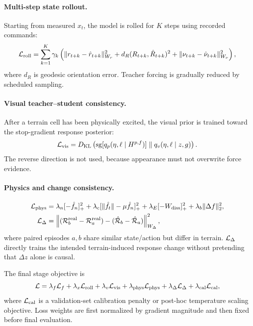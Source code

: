\paragraph{Multi-step state rollout.}
Starting from measured $x_t$, the model is rolled for $K$ steps using recorded commands:
\begin{equation}
\mathcal{L}_{\mathrm{roll}}=\sum_{k=1}^{K}\gamma_k
\left(\lVert r_{t+k}-\hat r_{t+k}\rVert_{W_r}^2+
d_R(R_{t+k},\hat R_{t+k})^2+
\lVert\nu_{t+k}-\hat\nu_{t+k}\rVert_{W_\nu}^2\right),
\label{eq:rollout_loss}
\end{equation}
where $d_R$ is geodesic orientation error. Teacher forcing is gradually reduced by scheduled sampling.

\paragraph{Visual teacher--student consistency.}
After a terrain cell has been physically excited, the visual prior is trained toward the stop-gradient response posterior:
\begin{equation}
\mathcal{L}_{\mathrm{vis}}=
D_{\mathrm{KL}}\left(\operatorname{sg}[q_p(\eta,\ell\mid H^{p,f})]\;\Vert\;q_v(\eta,\ell\mid z,g)\right).
\label{eq:vis_distill}
\end{equation}
The reverse direction is not used, because appearance must not overwrite force evidence.

\paragraph{Physics and change consistency.}
\begin{align}
\mathcal{L}_{\mathrm{phys}} &=
\lambda_n[-\hat f_n]_+^2+
\lambda_c[\lVert\hat f_t\rVert-\mu\hat f_n]_+^2+
\lambda_E[-W_{\mathrm{diss}}]_+^2+
\lambda_b\lVert\Delta f\rVert_2^2,\\
\mathcal{L}_\Delta &=
\left\lVert
(\mathcal R_b^{\mathrm{real}}-\mathcal R_a^{\mathrm{real}})
-(\hat{\mathcal R}_b-\hat{\mathcal R}_a)
\right\rVert_{W_\Delta}^2,
\label{eq:physics_change_loss}
\end{align}
where paired episodes $a,b$ share similar state/action but differ in terrain. $\mathcal{L}_\Delta$ directly trains the intended terrain-induced response change without pretending that $\Delta z$ alone is causal.

The final stage objective is
\begin{equation}
\mathcal{L}=\lambda_f\mathcal{L}_f+\lambda_x\mathcal{L}_{\mathrm{roll}}+\lambda_v\mathcal{L}_{\mathrm{vis}}
+\lambda_{\mathrm{phys}}\mathcal{L}_{\mathrm{phys}}+\lambda_\Delta\mathcal{L}_\Delta
+\lambda_{\mathrm{cal}}\mathcal{L}_{\mathrm{cal}},
\label{eq:total_loss}
\end{equation}
where $\mathcal{L}_{\mathrm{cal}}$ is a validation-set calibration penalty or post-hoc temperature scaling objective. Loss weights are first normalized by gradient magnitude and then fixed before final evaluation.

